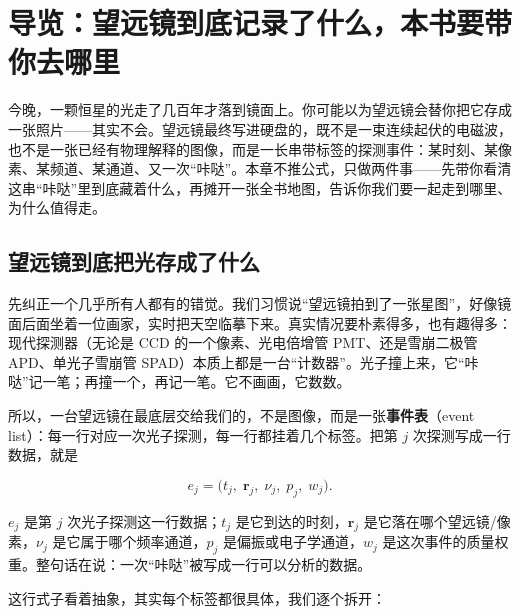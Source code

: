 \chapter{导览：望远镜到底记录了什么，本书要带你去哪里}
\label{chap:e00}

\begin{chapteropening}
今晚，一颗恒星的光走了几百年才落到镜面上。你可能以为望远镜会替你把它存成一张照片——其实不会。望远镜最终写进硬盘的，既不是一束连续起伏的电磁波，也不是一张已经有物理解释的图像，而是一长串带标签的探测事件：某时刻、某像素、某频道、某通道、又一次“咔哒”。本章不推公式，只做两件事——先带你看清这串“咔哒”里到底藏着什么，再摊开一张全书地图，告诉你我们要一起走到哪里、为什么值得走。
\end{chapteropening}

\section{望远镜到底把光存成了什么}
\label{sec:e00-event}

先纠正一个几乎所有人都有的错觉。我们习惯说“望远镜拍到了一张星图”，好像镜面后面坐着一位画家，实时把天空临摹下来。真实情况要朴素得多，也有趣得多：现代探测器（无论是 CCD 的一个像素、光电倍增管 PMT、还是雪崩二极管 APD、单光子雪崩管 SPAD）本质上都是一台“计数器”。光子撞上来，它“咔哒”记一笔；再撞一个，再记一笔。它不画画，它数数。

所以，一台望远镜在最底层交给我们的，不是图像，而是一张\textbf{事件表}（event list）：每一行对应一次光子探测，每一行都挂着几个标签。把第 \(j\) 次探测写成一行数据，就是

\begin{equation}
  e_j=\bigl(t_j,\;\bm r_j,\;\nu_j,\;p_j,\;w_j\bigr).
  \label{eq:e00-event}
\end{equation}
\begin{formulaexplain}
\(e_j\) 是第 \(j\) 次光子探测这一行数据；\(t_j\) 是它到达的时刻，\(\bm r_j\) 是它落在哪个望远镜/像素，\(\nu_j\) 是它属于哪个频率通道，\(p_j\) 是偏振或电子学通道，\(w_j\) 是这次事件的质量权重。整句话在说：一次“咔哒”被写成一行可以分析的数据。
\end{formulaexplain}

这行式子看着抽象，其实每个标签都很具体，我们逐个拆开：

